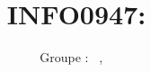 \documentclass[a4paper, 11pt, oneside]{article}
\title{INFO0947: \intitule}
\author{Groupe \GrNbr: \PrenomUN~\textsc{\NomUN}, \PrenomDEUX~\textsc{\NomDEUX}}
\date{}
\newcommand{\tablemat}{~}
\renewcommand{\tablemat}{\tableofcontents}
\begin{document}
\maketitle
\newpage
\tablemat
\newpage



















\end{document}

